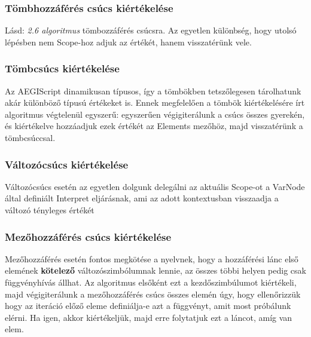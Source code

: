 \documentclass[a4paper,12pt]{report}
\begin{document}


\subsubsection{Tömbhozzáférés csúcs kiértékelése}
Lásd: \textit{2.6 algoritmus} tömbozzáférés csúcsra. Az egyetlen különbség, hogy utolsó lépésben nem Scope-hoz adjuk az értékét, hanem visszatérünk vele.



\subsubsection{Tömbcsúcs kiértékelése}
Az AEGIScript dinamikusan típusos, így a tömbökben tetszőlegesen tárolhatunk akár különböző típusú értékeket is. Ennek megfelelően a tömbök kiértékelésére írt algoritmus végtelenül egyszerű: egyszerűen végigiterálunk a csúcs összes gyerekén, és kiértékelve hozzáadjuk ezek értékét az Elements mezőhöz, majd visszatérünk a tömbcsúccsal.





\subsubsection{Változócsúcs kiértékelése}
Változócsúcs esetén az egyetlen dolgunk delegálni az aktuális Scope-ot a VarNode által definiált Interpret eljárásnak, ami az adott kontextusban visszaadja a változó tényleges értékét







\subsubsection{Mezőhozzáférés csúcs kiértékelése}
Mezőhozzáférés esetén fontos megkötése a nyelvnek, hogy a hozzáférési lánc első elemének \textbf{kötelező} változószimbólumnak lennie, az összes többi helyen pedig csak függvényhívás állhat. Az algoritmus elsőként ezt a kezdőszimbúlumot kiértékeli, majd végigiterálunk a mezőhozzáférés csúcs összes elemén úgy, hogy ellenőrizzük hogy az iteráció előző eleme definiálja-e azt a függvényt, amit most próbálunk elérni. Ha igen, akkor kiértékeljük, majd erre folytatjuk ezt a láncot, amíg van elem.

\end{document}
